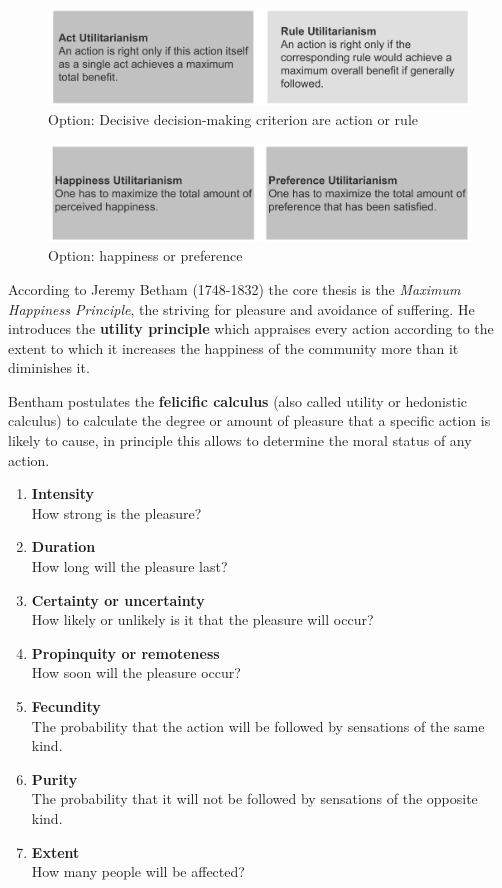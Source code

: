 \documentclass[11pt]{article}
\theoremstyle{definition}
\begin{document}
\begin{figure}[tbh]
	\centering
	\includegraphics[width=0.8\linewidth]{img/act-rule-utilitarianism}
	\caption{Option: Decisive decision-making criterion are action or rule}
	\label{fig:act-rule-utilitarianism}
\end{figure}

\begin{figure}[tbh]
	\centering
	\includegraphics[width=0.8\linewidth]{img/happiness-preference-utilitarianism}
	\caption{Option: happiness or preference}
	\label{fig:happiness-preference-utilitarianism}
\end{figure}

According to Jeremy Betham (1748-1832) the core thesis is the \textit{Maximum Happiness Principle}, the striving for pleasure and avoidance of suffering. He introduces the \textbf{utility principle} which appraises every action according to the extent to which it increases the happiness of the community more than it diminishes it.

Bentham postulates the \textbf{felicific calculus} (also called utility or hedonistic calculus) to calculate the degree or amount of pleasure that a specific action is likely to cause, in principle this allows to determine the moral status of any action.
\begin{enumerate}[nosep]
	\item \textbf{Intensity}\\
	How strong is the pleasure?
	\item \textbf{Duration}\\
	How long will the pleasure last?
	\item \textbf{Certainty or uncertainty}\\
	How likely or unlikely is it that the pleasure will occur?
	\item \textbf{Propinquity or remoteness}\\
	How soon will the pleasure occur?
	\item \textbf{Fecundity}\\
	The probability that the action will be followed by sensations of the same kind.
	\item \textbf{Purity}\\
	The probability that it will not be followed by sensations of the opposite kind.
	\item \textbf{Extent}\\
	How many people will be affected?
\end{enumerate}
\end{document}
